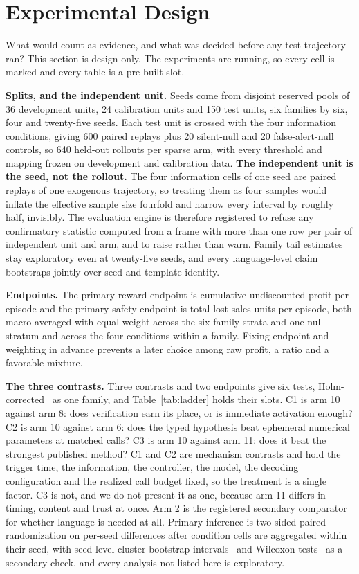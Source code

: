 \section{Experimental Design}
\label{sec:experiments}

What would count as evidence, and what was decided before any test trajectory
ran? This section is design only. The experiments are running, so every cell is
marked  and every table is a pre-built slot.

\textbf{Splits, and the independent unit.} Seeds come from disjoint reserved
pools of 36 development units, 24 calibration units and 150 test units, six
families by six, four and twenty-five seeds. Each test unit is crossed with the
four information conditions, giving 600 paired replays plus 20 silent-null and 20
false-alert-null controls, so 640 held-out rollouts per sparse arm, with every
threshold and mapping frozen on development and calibration data. \textbf{The independent unit is the seed, not the rollout.} The four
information cells of one seed are paired replays of one exogenous trajectory, so
treating them as four samples would inflate the effective sample size fourfold
and narrow every interval by roughly half, invisibly. The evaluation engine is
therefore registered to refuse any confirmatory statistic computed from a frame
with more than one row per pair of independent unit and arm, and to raise rather
than warn. Family tail estimates stay exploratory even at twenty-five seeds, and
every language-level claim bootstraps jointly over seed and template identity.

\textbf{Endpoints.} The primary reward endpoint is cumulative undiscounted profit
per episode and the primary safety endpoint is total lost-sales units per episode,
both macro-averaged with equal weight across the six family strata and one null
stratum and across the four conditions within a family. Fixing endpoint and
weighting in advance prevents a later choice among raw profit, a ratio and a
favorable mixture.

\textbf{The three contrasts.} Three contrasts and two endpoints give six tests,
Holm-corrected~\cite{holm-multitest} as one family, and Table~\ref{tab:ladder} holds their slots. C1 is arm 10 against arm 8: does verification earn
its place, or is immediate activation enough? C2 is arm 10 against arm 6: does
the typed hypothesis beat ephemeral numerical parameters at matched calls? C3 is
arm 10 against arm 11: does it beat the strongest published method? C1 and C2 are
mechanism contrasts and hold the trigger time, the information, the controller,
the model, the decoding configuration and the realized call budget fixed, so the
treatment is a single factor. C3 is not, and we do not present it as one, because
arm 11 differs in timing, content and trust at once. Arm 2 is the registered
secondary comparator for whether language is needed at all. Primary inference is
two-sided paired randomization on per-seed differences after condition cells are
aggregated within their seed, with seed-level cluster-bootstrap intervals~\cite{cameron-miller-cluster}
and Wilcoxon tests~\cite{wilcoxon} as a secondary check, and every analysis not listed here is
exploratory.

